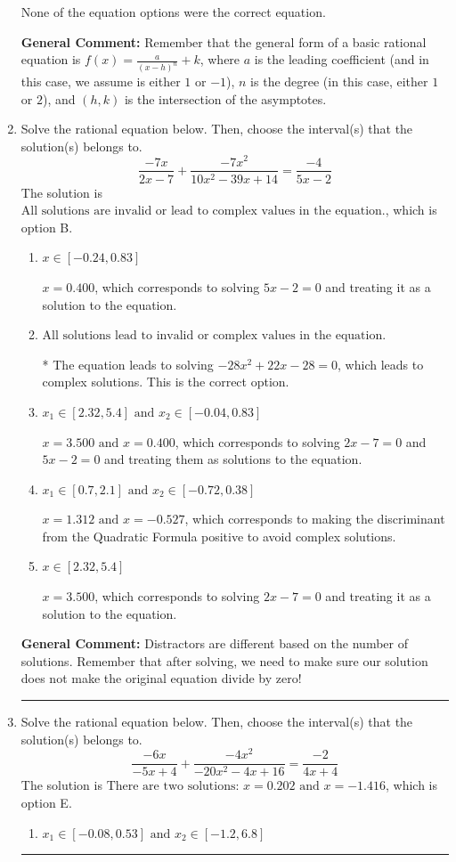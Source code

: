 \documentclass{extbook}[14pt]
\newcommand{\litem}[1]{\item #1

\rule{\textwidth}{0.4pt}}
\begin{document}
\begin{enumerate}
{\begin{enumerate}[label=\Alph*.]
None of the equation options were the correct equation.
\end{enumerate}

\textbf{General Comment:} Remember that the general form of a basic rational equation is $ f(x) = \frac{a}{(x-h)^n} + k$, where $a$ is the leading coefficient (and in this case, we assume is either $1$ or $-1$), $n$ is the degree (in this case, either $1$ or $2$), and $(h, k)$ is the intersection of the asymptotes.
}
\litem{
Solve the rational equation below. Then, choose the interval(s) that the solution(s) belongs to.
\[ \frac{-7x}{2x -7} + \frac{-7x^{2}}{10x^{2} -39 x + 14} = \frac{-4}{5x -2} \]The solution is \( \text{All solutions are invalid or lead to complex values in the equation.} \), which is option B.\begin{enumerate}[label=\Alph*.]
\item \( x \in [-0.24,0.83] \)

$x = 0.400$, which corresponds to solving $5x -2 = 0$ and treating it as a solution to the equation.
\item \( \text{All solutions lead to invalid or complex values in the equation.} \)

* The equation leads to solving $-28x^{2} +22 x -28=0$, which leads to complex solutions. This is the correct option.
\item \( x_1 \in [2.32, 5.4] \text{ and } x_2 \in [-0.04,0.83] \)

$x = 3.500 \text{ and } x = 0.400$, which corresponds to solving $2x -7 = 0$ and $5x -2 = 0$ and treating them as solutions to the equation.
\item \( x_1 \in [0.7, 2.1] \text{ and } x_2 \in [-0.72,0.38] \)

$x = 1.312 \text{ and } x = -0.527$, which corresponds to making the discriminant from the Quadratic Formula positive to avoid complex solutions.
\item \( x \in [2.32,5.4] \)

$x = 3.500$, which corresponds to solving $2x -7 = 0$ and treating it as a solution to the equation.
\end{enumerate}

\textbf{General Comment:} Distractors are different based on the number of solutions. Remember that after solving, we need to make sure our solution does not make the original equation divide by zero!
}
\litem{
Solve the rational equation below. Then, choose the interval(s) that the solution(s) belongs to.
\[ \frac{-6x}{-5x + 4} + \frac{-4x^{2}}{-20x^{2} -4 x + 16} = \frac{-2}{4x + 4} \]The solution is \( \text{There are two solutions: } x = 0.202 \text{ and } x = -1.416 \), which is option E.\begin{enumerate}[label=\Alph*.]
\item \( x_1 \in [-0.08, 0.53] \text{ and } x_2 \in [-1.2,6.8] \)



\end{enumerate}}
\end{enumerate}
\end{document}
